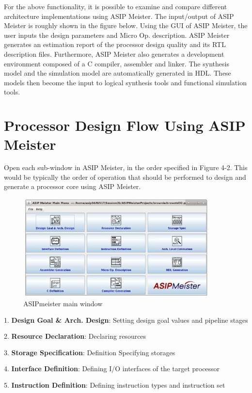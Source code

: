For the above functionality, it is possible to examine and compare
different architecture implementations using ASIP Meister. The
input/output of ASIP Meister is roughly shown in the figure below. Using
the GUI of ASIP Meister, the user inputs the design parameters and Micro
Op. description. ASIP Meister generates an estimation report of the
processor design quality and its RTL description files. Furthermore,
ASIP Meister also generates a development environment composed of a C
compiler, assembler and linker. The synthesis model and the simulation
model are automatically generated in HDL. These models then become the
input to logical synthesis tools and functional simulation tools.
\hypertarget{processor-design-flow-using-asip-meister}{%
\section{Processor Design Flow Using ASIP
Meister}\label{processor-design-flow-using-asip-meister}}
Open each sub-window in ASIP Meister, in the order specified in Figure
4-2. This would be typically the order of operation that should be
performed to design and generate a processor core using ASIP Meister.
\begin{figure}[!htb]
	\centering
	\includegraphics[width=0.9\textwidth]{src/images/4-2.png}
	\caption{ASIPmeister main window}
	\label{fig:fig42}
\end{figure}

1. \textbf{Design Goal \& Arch. Design}: Setting design goal values and
pipeline stages

2. \textbf{Resource Declaration}: Declaring resources

3. \textbf{Storage Specification}: Definition Specifying storages

4. \textbf{Interface Definition}: Defining I/O interfaces of the target
processor

5. \textbf{Instruction Definition}: Defining instruction types and
instruction set

